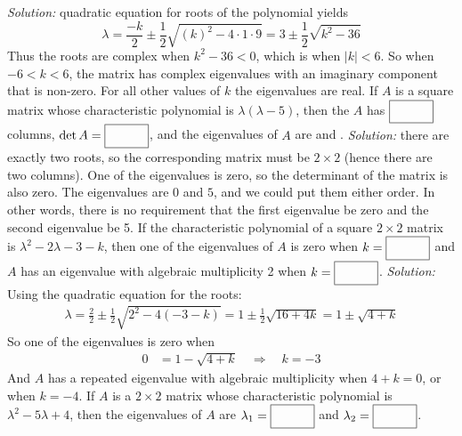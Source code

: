 \begin{parts}
        \ifnum {} {\color{DarkBlue} \textit{Solution:} quadratic equation for roots of the polynomial yields $$\lambda = \frac{-k}{2} \pm \frac12 \sqrt{(k)^2 - 4\cdot 1 \cdot 9} = 3 \pm \frac12 \sqrt{k^2 - 36}$$ Thus the roots are complex when $k^2 - 36 < 0$, which is when $|k| < 6$. So when $-6 < k < 6$, the matrix has complex eigenvalues with an imaginary component that is non-zero. For all other values of $k$ the eigenvalues are real.  } \fi    
    \fi 
    \ifnum {}
        If $A$ is a square matrix whose characteristic polynomial is $\lambda (\lambda - 5)$, then the $A$ has $\framebox{\strut\hspace{1cm}}$ columns, $\det A = \framebox{\strut\hspace{1cm}}$, and the eigenvalues of $A$ are \framebox{\strut\hspace{1cm}} and \framebox{\strut\hspace{1cm}}.  
        \ifnum {} {\color{DarkBlue} \textit{Solution:} there are exactly two roots, so the corresponding matrix must be $2\times 2$ (hence there are two columns). One of the eigenvalues is zero, so the determinant of the matrix is also zero. The eigenvalues are $0$ and $5$, and we could put them either order. In other words, there is no requirement that the first eigenvalue be zero and the second eigenvalue be 5.  } \fi    
    \fi 
    \ifnum {}
        If the characteristic polynomial of a square $2\times2$ matrix is $\lambda^2 -2\lambda -3 - k$, then one of the eigenvalues of $A$ is zero when $k = \framebox{\strut\hspace{1cm}}$ and $A$ has an eigenvalue with algebraic multiplicity 2 when $k = \framebox{\strut\hspace{1cm}}$. 
        \ifnum {} {\color{DarkBlue} \textit{Solution:} Using the quadratic equation for the roots:
        \begin{align}
            \lambda = \frac{2}{2} \pm \frac12 \sqrt{2^2 - 4(-3-k)} = 1 \pm \frac12 \sqrt{16 + 4k} = 1 \pm \sqrt{4 + k}
        \end{align}
        So one of the eigenvalues is zero when 
        \begin{align}
            0 &= 1 - \sqrt{4 + k} \quad \Rightarrow \quad k = -3
        \end{align} And $A$ has a repeated eigenvalue with algebraic multiplicity when $4+k=0$, or when $k = -4$.} \fi    
    \fi 
    \ifnum {}
        If $A$ is a $2\times 2$ matrix whose characteristic polynomial is $\lambda ^2 - 5\lambda + 4$, then the eigenvalues of $A$ are $\lambda_1 = \framebox{\strut\hspace{1cm}}$ and $\lambda_2 = \framebox{\strut\hspace{1cm}}$. 

\end{parts}
